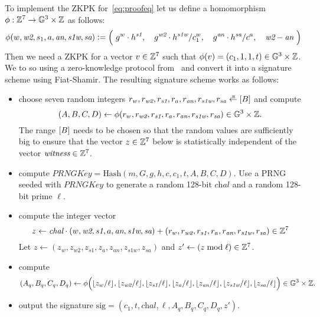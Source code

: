 \documentclass[11pt]{article}
\begin{document}
To implement the ZKPK for~\eqref{eq:proofeq} let us define a 
homomorphism $\phi:\mathbb Z^7 \to \mathbb G^3 \times \mathbb Z$ as follows:
\[ 
  \phi(w, \textit{w2}, s_1, a, \textit{an}, \textit{s1w}, \textit{sa}) \deq
      \Big(\ 
       g^w \cdot h^{\textit{s1}},\ \ \ 
       g^{\textit{w2}} \cdot h^{\textit{s1w}} / c_1^w,\ \ \ 
       g^{\textit{an}} \cdot h^{\textit{sa}} / c^a,\ \ \ 
       \textit{w2} - \textit{an}\ \Big)
\]
Then we need a ZKPK for a vector $v \in \mathbb Z^7$
such that $\phi(v) = (c_1, 1, 1, t) \in \mathbb G^3 \times \mathbb Z$. 
We to so using a zero-knowledge protocol from~\cite[\S 3.5]{ourpaper} 
and convert it
into a signature scheme using Fiat-Shamir.  
The resulting signature scheme works as follows:
\begin{itemize}
\item choose seven random integers
            $r_w, r_\textit{w2}, r_\textit{s1}, r_a, r_\textit{an}, r_\textit{s1w}, r_\textit{sa} \rgets \range{B}$ and compute
\[ (A,B,C,D) \gets \phi(r_w, r_\textit{w2}, r_\textit{s1}, r_a, r_\textit{an}, r_\textit{s1w}, r_\textit{sa}) \in \mathbb G^3 \times \mathbb Z. \]
The range $[{B}]$ needs to be chosen so that the
random values are sufficiently big to ensure that the vector $z \in \mathbb Z^7$ below
is statistically independent of the vector $\textit{witness} \in \mathbb Z^7$. 


\item compute
            $\textit{PRNGKey} = \text{Hash}(m, G, g, h, c, c_1, t, A, B, C, D)$.
Use a PRNG seeded with $\textit{PRNGKey}$ to generate a random
  128-bit $\textit{chal}$ and a random 128-bit prime $\ell$.


\item compute the integer vector
   \[  z \gets \textit{chal} \cdot (w, \textit{w2}, \textit{s1}, a, \textit{an}, \textit{s1w}, \textit{sa}) +
                   (r_w, r_\textit{w2}, r_\textit{s1}, r_a, r_\textit{an}, r_\textit{s1w}, r_\textit{sa})  \in \mathbb Z^7  \]
Let $z \gets (z_w, z_\textit{w2}, z_\textit{s1}, z_a, z_\textit{an}, z_\textit{s1w}, z_\textit{sa})$
and $z' \gets (z \bmod \ell) \in \mathbb Z^7$.

\item compute 
\[  (A_q, B_q, C_q, D_q) \gets \phi\Big(
        \lfloor z_w / \ell \rfloor, 
        \lfloor z_\textit{w2} / \ell \rfloor, 
        \lfloor z_\textit{s1} / \ell \rfloor, 
        \lfloor z_a / \ell \rfloor, 
        \lfloor z_\textit{an} / \ell \rfloor, 
        \lfloor z_\textit{s1w} / \ell \rfloor, 
        \lfloor z_\textit{sa} / \ell \rfloor \Big) \in \mathbb G^3 \times \mathbb Z. \]

\item output the signature 
$\text{sig} = (c_1, t, \textit{chal}, \ell, A_q, B_q, C_q, D_q, z')$.
\end{itemize}
\end{document}
